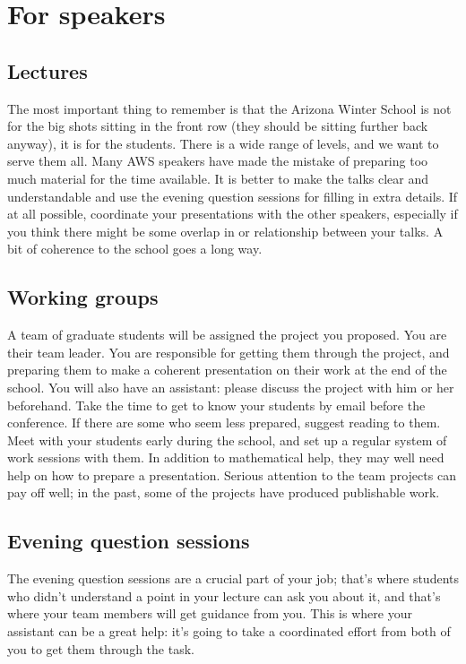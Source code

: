 \documentclass{article}
\begin{document}
\section{For speakers}
\label{sec:speakers}


\subsection{Lectures}
\label{sec:lectures-1}
The most important thing to remember is that the Arizona Winter School
is not for the big shots sitting in the front row (they should be sitting further back anyway),  
it is for the students. There is a wide range of levels, and we
want to serve them all. Many AWS speakers have made the mistake of
preparing too much material for the time available. It is better to
make the talks clear and understandable and use the evening question
sessions for filling in extra details.  If at all possible, coordinate your presentations 
with the other speakers, especially if you think there might be some overlap in 
or relationship between your talks.  A bit of coherence to the school goes a 
long way.

\subsection{Working groups}
\label{sec:working-groups-1}
A team of graduate students will be assigned the project you
proposed. You are their team leader. You are responsible for getting
them through the project, and preparing them to make a coherent
presentation on their work at the end of the school. 
You will also have an assistant: please
discuss the project with him or her beforehand. 
Take the time to
get to know your students by email before the conference. If there are some who
seem less prepared, suggest reading to them. Meet with your students
early during the school, and set up a regular system of work sessions
with them.  In addition to
mathematical help, they may well need help on how to prepare a
presentation. Serious attention to the team projects can pay off well;
in the past, some of the projects have produced publishable work.

\subsection{Evening question sessions}
\label{sec:even-work-sess}
The evening question sessions are a crucial part of your job; that's
where students who didn't understand a point in your lecture can ask
you about it, and that's where your team members will get guidance
from you. This is where your assistant can be a great help: it's going
to take a coordinated effort from both of you to get them through the task.
\end{document}
